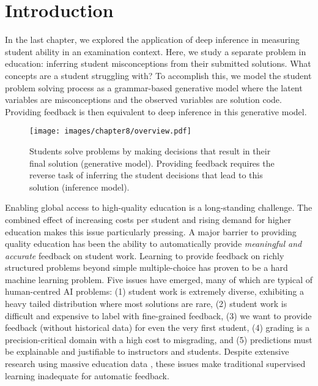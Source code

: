 \section{Introduction}
In the last chapter, we explored the application of deep inference in measuring student ability in an examination context. Here, we study a separate problem in education: inferring student misconceptions from their submitted solutions. What concepts are a student struggling with? To accomplish this, we model the student problem solving process as a grammar-based generative model where the latent variables are misconceptions and the observed variables are solution code. Providing feedback is then equivalent to deep inference in this generative model. 

\begin{figure}
    \centering
    \texttt{[image: images/chapter8/overview.pdf]}
    \caption{Students solve problems by making decisions that result in their final solution (generative model). Providing feedback requires the reverse task of inferring the student decisions that lead to this solution (inference model).}
    \label{fig:overview}
\end{figure}

Enabling global access to high-quality education is a long-standing challenge. 
The combined effect of increasing costs per student \cite{bowen2012cost} and rising demand for higher education makes this issue particularly pressing. A major barrier to providing quality education has been the ability to automatically provide \emph{meaningful and accurate} feedback on student work.
Learning to provide feedback on richly structured problems beyond simple multiple-choice has proven to be a hard machine learning problem. Five issues have emerged, many of which are typical of human-centred AI problems: (1) student work is extremely diverse, exhibiting a heavy tailed distribution where most solutions are rare, (2) student work is difficult and expensive to label with fine-grained feedback, (3) we want to provide feedback (without historical data) for even the very first student, (4) grading is a precision-critical domain with a high cost to misgrading, and (5) predictions must be explainable and justifiable to instructors and students.  Despite extensive research using massive education data \cite{piech2015deep,basu2013powergrading,yan_pyramid,wang2017learning,liu2019automated,hu2019reliable}, these issues make traditional supervised learning inadequate for automatic feedback.

